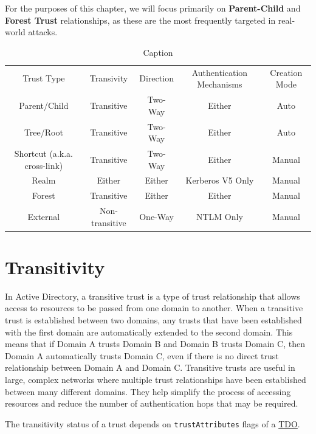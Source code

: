 For the purposes of this chapter, we will focus primarily on \textbf{Parent-Child} and \textbf{Forest Trust} relationships, as these are the most frequently targeted in real-world attacks.


\begin{table}
    \centering
    \begin{tabular}{ccccc}
         Trust Type&  Transivity&  Direction&  Authentication Mechanisms& Creation Mode\\
         Parent/Child&  Transitive&  Two-Way&  Either& Auto\\
         Tree/Root&  Transitive& Two-Way&  Either& Auto \\
         Shortcut (a.k.a. cross-link)&  Transitive&  Two-Way&  Either& Manual \\
         Realm&  Either& Either&  Kerberos V5 Only& Manual\\
         Forest&  Transitive&  Either&  Either& Manual\\
         External&  Non-transitive&  One-Way&  NTLM Only& Manual\\
    \end{tabular}
    \caption{Caption}
    \label{tab:placeholder}
\end{table}

\section{Transitivity}
In Active Directory, a transitive trust is a type of trust relationship that allows access to resources to be passed from one domain to another. When a transitive trust is established between two domains, any trusts that have been established with the first domain are automatically extended to the second domain. This means that if Domain A trusts Domain B and Domain B trusts Domain C, then Domain A automatically trusts Domain C, even if there is no direct trust relationship between Domain A and Domain C. Transitive trusts are useful in large, complex networks where multiple trust relationships have been established between many different domains. They help simplify the process of accessing resources and reduce the number of authentication hops that may be required.

The transitivity status of a trust depends on \texttt{trustAttributes} flags of a \href{https://learn.microsoft.com/en-us/openspecs/windows_protocols/ms-adts/b645c125-a7da-4097-84a1-2fa7cea07714\#gt_f2ceef4e-999b-4276-84cd-2e2829de5fc4}{TDO}.

